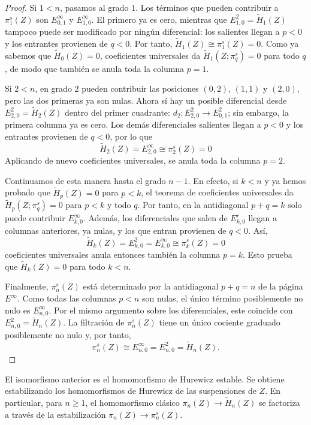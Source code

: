 \begin{proof}
Si $1<n$, pasamos al grado $1$. Los términos que pueden contribuir a $\pi_1^s(Z)$ son $E^\infty_{0,1}$ y $E^\infty_{1,0}$. El primero ya es cero, mientras que $E^2_{1,0}=\tilde H_1(Z)$ tampoco puede ser modificado por ningún diferencial: los salientes llegan a $p<0$ y los entrantes provienen de $q<0$. Por tanto, $\tilde H_1(Z)\cong\pi_1^s(Z)=0$. Como ya sabemos que $\tilde H_0(Z)=0$, coeficientes universales da $\tilde H_1(Z;\pi_q^s)=0$ para todo $q$, de modo que también se anula toda la columna $p=1$.

Si $2<n$, en grado $2$ pueden contribuir las posiciones $(0,2)$, $(1,1)$ y $(2,0)$, pero las dos primeras ya son nulas. Ahora sí hay un posible diferencial desde $E^2_{2,0}=\tilde H_2(Z)$ dentro del primer cuadrante: $d_2\colon E^2_{2,0}\to E^2_{0,1}$; sin embargo, la primera columna ya es cero. Los demás diferenciales salientes llegan a $p<0$ y los entrantes provienen de $q<0$, por lo que
\[
\tilde H_2(Z)=E^\infty_{2,0}\cong\pi_2^s(Z)=0
\]
Aplicando de nuevo coeficientes universales, se anula toda la columna $p=2$.

Continuamos de esta manera hasta el grado $n-1$. En efecto, si $k<n$ y ya hemos probado que $\tilde H_p(Z)=0$ para $p<k$, el teorema de coeficientes universales da $\tilde H_p(Z;\pi_q^s)=0$ para $p<k$ y todo $q$. Por tanto, en la antidiagonal $p+q=k$ solo puede contribuir $E^\infty_{k,0}$. Además, los diferenciales que salen de $E^r_{k,0}$ llegan a columnas anteriores, ya nulas, y los que entran provienen de $q<0$. Así,
\[
\tilde H_k(Z)=E^2_{k,0}=E^\infty_{k,0}\cong\pi_k^s(Z)=0
\]
coeficientes universales anula entonces también la columna $p=k$. Esto prueba que $\tilde H_k(Z)=0$ para todo $k<n$.

Finalmente, $\pi_n^s(Z)$ está determinado por la antidiagonal $p+q=n$ de la página $E^\infty$. Como todas las columnas $p<n$ son nulas, el único término posiblemente no nulo es $E^\infty_{n,0}$. Por el mismo argumento sobre los diferenciales, este coincide con $E^2_{n,0}=\tilde H_n(Z)$. La filtración de $\pi_n^s(Z)$ tiene un único cociente graduado posiblemente no nulo y, por tanto,
\[
\pi_n^s(Z)\cong E^\infty_{n,0}=E^2_{n,0}=\tilde H_n(Z).
\]
\end{proof}

\begin{nota}
El isomorfismo anterior es el homomorfismo de Hurewicz estable. Se obtiene estabilizando los homomorfismos de Hurewicz de las suspensiones de $Z$. En particular, para $n\ge1$, el homomorfismo clásico $\pi_n(Z)\to\tilde H_n(Z)$ se factoriza a través de la estabilización $\pi_n(Z)\to\pi_n^s(Z)$.
\end{nota}

